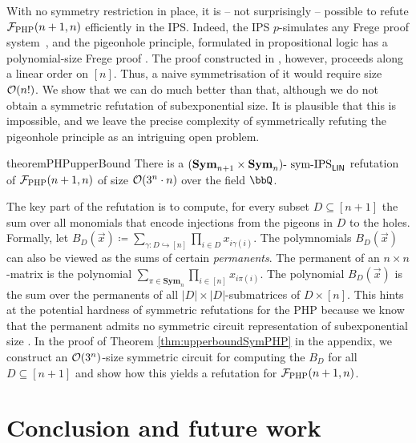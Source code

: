 \documentclass[10pt,a4paper]{article}
\newcommand{\Sym}{{\mathbf{Sym}}}
\newcommand{\Ff}{{\cal F}}
\newcommand{\Oo}{{\cal O}}
\newcommand{\PHP}{\Ff_{\mathrm{PHP}}}
\newcommand{\symIPSlin}{\text{ \upshape sym-IPS}_{\mathsf{LIN}}}
\begin{document}
With no symmetry restriction in place, it is -- not surprisingly -- possible to refute $\PHP(n+1,n)$ efficiently in the IPS.  Indeed, the IPS $p$-simulates any Frege proof system~\cite{IPS}, and the pigeonhole principle, formulated in propositional logic has a polynomial-size Frege proof \cite{buss1987polynomial}. The proof constructed in \cite{buss1987polynomial}, however, proceeds along a linear order on $[n]$. Thus, a naive symmetrisation of it would require size $\Oo(n!)$.
We show that we can do much better than that, although we do not obtain a symmetric refutation of subexponential size. It is plausible that this is impossible, and we leave the precise complexity of symmetrically refuting the pigeonhole principle as an intriguing open problem.
\begin{restatable}{theorem}{PHPupperBound}
	\label{thm:upperboundSymPHP}
	There is a $(\Sym_{n+1} \times \Sym_n)\text{-}\symIPSlin$ refutation of $\PHP(n+1,n)$ of size $\Oo(3^n \cdot n)$ over the field $\bbQ$.
\end{restatable}	
The key part of the refutation is to compute, for every subset $D \subseteq [n+1]$ the sum over all monomials that encode injections from the pigeons in $D$ to the holes. Formally, let
$
B_D(\vec x) \coloneqq \sum_{\gamma \colon D \hookrightarrow [n]} \prod_{i \in D} x_{i\gamma(i)}.
$
The polymnomials $B_D(\vec x)$ can also be viewed as the sums of certain \emph{permanents}. The permanent of an $n \times n$-matrix is the polynomial $\sum_{\pi \in \Sym_n} \prod_{i \in [n]} x_{i\pi(i)}$. The polynomial $B_D(\vec x)$ is the sum over the permanents of all $|D| \times |D|$-submatrices of $D \times [n]$. 
This hints at the potential hardness of symmetric refutations for the PHP because we know that the permanent admits no symmetric circuit representation of subexponential size \cite{DawarW20}. 
In the proof of Theorem \ref{thm:upperboundSymPHP} in the appendix, we construct an $\Oo(3^n)$-size symmetric circuit for computing the $B_D$ for all $D \subseteq [n+1]$ and show how this yields a refutation for $\PHP(n+1,n)$.


\section{Conclusion and future work}
\end{document}

